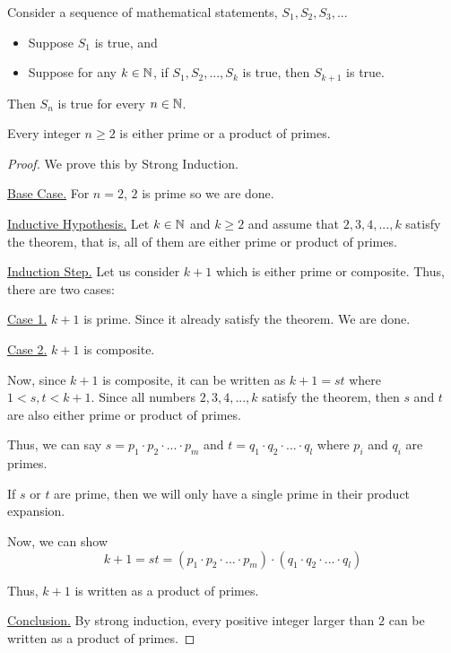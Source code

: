 \begin{principle}
	Consider a sequence of mathematical statements, $S_1, S_2, S_3, ...$
	\begin{itemize}
		\item Suppose $S_1$ is true, and 
		\item Suppose for any $k \in \mathbb{N}$, if $S_1, S_2, ..., S_k$ is true, then $S_{k+1}$ is true.
	\end{itemize}

	Then $S_n$ is true for every $n \in \mathbb{N}$.
\end{principle}

\begin{theorem}
	Every integer $n \geq 2$ is either prime or a product of primes.
\end{theorem}

\begin{proof}
	We prove this by Strong Induction.

	\underline{Base Case.} For $n = 2$, $2$ is prime so we are done.

	\underline{Inductive Hypothesis.} Let $k \in \mathbb{N}$ and $k \geq 2$ and assume that $2, 3, 4, ..., k$ satisfy the theorem, that is, all of them are either prime or product of primes.
	
	\underline{Induction Step.} Let us consider $k+1$ which is either prime or composite. Thus, there are two cases:

	\underline{Case 1.} $k+1$ is prime. Since it already satisfy the theorem. We are done.

	\underline{Case 2.} $k+1$ is composite.

	Now, since $k+1$ is composite, it can be written as $k+1 = st$ where $1 < s, t < k+1$. Since all numbers $2, 3, 4, ..., k$ satisfy the theorem, then $s$ and $t$ are also either prime or product of primes.

	Thus, we can say $s = p_1 \cdot p_2 \cdot ... \cdot p_m$ and $t = q_1 \cdot q_2 \cdot ... \cdot q_l$ where $p_i$ and $q_i$ are primes.

	If $s$ or $t$ are prime, then we will only have a single prime in their product expansion.

	Now, we can show
	$$k+1 = st = (p_1 \cdot p_2 \cdot ... \cdot p_m) \cdot (q_1 \cdot q_2 \cdot ... \cdot q_l)$$

	Thus, $k+1$ is written as a product of primes.

	\underline{Conclusion.} By strong induction, every positive integer larger than $2$ can be written as a product of primes.
\end{proof}


